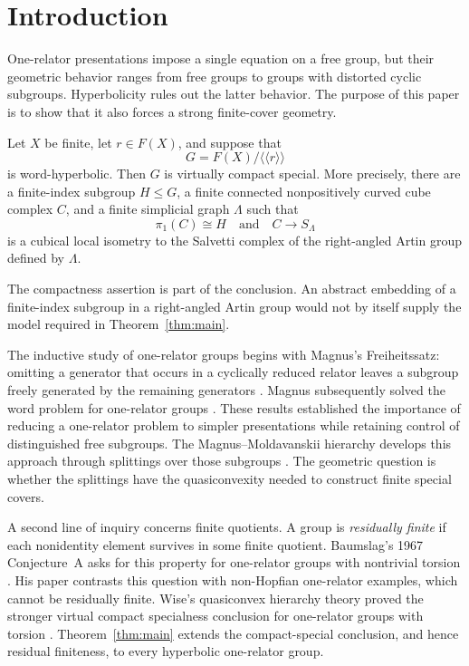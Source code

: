\section{Introduction}\label{sec:introduction}

One-relator presentations impose a single equation on a free group, but their geometric behavior ranges from free groups to groups with distorted cyclic subgroups. Hyperbolicity rules out the latter behavior. The purpose of this paper is to show that it also forces a strong finite-cover geometry.

\begin{theorem}\label{thm:main}
Let $X$ be finite, let $r\in F(X)$, and suppose that
\[
G=F(X)/\langle\!\langle r\rangle\!\rangle
\]
is word-hyperbolic. Then $G$ is virtually compact special. More precisely, there are a finite-index subgroup $H\leq G$, a finite connected nonpositively curved cube complex $C$, and a finite simplicial graph $\Lambda$ such that
\[
\pi_1(C)\cong H
\quad\text{and}\quad
C\longrightarrow S_\Lambda
\]
is a cubical local isometry to the Salvetti complex of the right-angled Artin group defined by $\Lambda$.
\end{theorem}

The compactness assertion is part of the conclusion. An abstract embedding of a finite-index subgroup in a right-angled Artin group would not by itself supply the model required in Theorem~\ref{thm:main}.

The inductive study of one-relator groups begins with Magnus's
Freiheitssatz: omitting a generator that occurs in a cyclically reduced
relator leaves a subgroup freely generated by the remaining generators
\cite{Magnus1930}. Magnus subsequently solved the word problem for
one-relator groups \cite{Magnus1932}. These results established the
importance of reducing a one-relator problem to simpler presentations
while retaining control of distinguished free subgroups. The Magnus--Moldavanskii
hierarchy develops this approach through splittings over those subgroups
\cite[Sections~1.1--1.3]{LintonHierarchies2025}.
The geometric question is whether the splittings have the quasiconvexity
needed to construct finite special covers.

A second line of inquiry concerns finite quotients. A group is
\emph{residually finite} if each nonidentity element survives in some
finite quotient. Baumslag's 1967 Conjecture~A asks for this property for
one-relator groups with nontrivial torsion \cite{Baumslag1967Residual}.
His paper contrasts this question with non-Hopfian one-relator examples,
which cannot be residually finite. Wise's quasiconvex hierarchy theory
proved the stronger virtual compact specialness conclusion for
one-relator groups with torsion \cite[Corollary~19.2]{Wise2021}.
Theorem~\ref{thm:main} extends the compact-special conclusion, and hence
residual finiteness, to every hyperbolic one-relator group.

